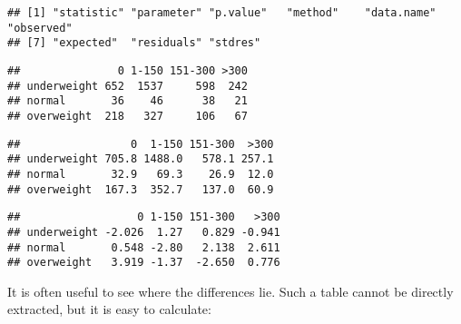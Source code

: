 \documentclass[]{book}
\newenvironment{Shaded}{\begin{snugshade}}{\end{snugshade}}
\newcommand{\DecValTok}[1]{\textcolor[rgb]{0.00,0.00,0.81}{#1}}
\newcommand{\StringTok}[1]{\textcolor[rgb]{0.31,0.60,0.02}{#1}}
\newcommand{\CommentTok}[1]{\textcolor[rgb]{0.56,0.35,0.01}{\textit{#1}}}
\newcommand{\OperatorTok}[1]{\textcolor[rgb]{0.81,0.36,0.00}{\textbf{#1}}}
\newcommand{\NormalTok}[1]{#1}
\theoremstyle{definition}
\theoremstyle{definition}
\theoremstyle{definition}
\theoremstyle{remark}
\begin{document}
\begin{verbatim}
## [1] "statistic" "parameter" "p.value"   "method"    "data.name" "observed" 
## [7] "expected"  "residuals" "stdres"
\end{verbatim}

\begin{Shaded}
\end{Shaded}

\begin{verbatim}
##               0 1-150 151-300 >300
## underweight 652  1537     598  242
## normal       36    46      38   21
## overweight  218   327     106   67
\end{verbatim}

\begin{Shaded}
\end{Shaded}

\begin{verbatim}
##                 0  1-150 151-300  >300
## underweight 705.8 1488.0   578.1 257.1
## normal       32.9   69.3    26.9  12.0
## overweight  167.3  352.7   137.0  60.9
\end{verbatim}

\begin{Shaded}
\end{Shaded}

\begin{verbatim}
##                  0 1-150 151-300   >300
## underweight -2.026  1.27   0.829 -0.941
## normal       0.548 -2.80   2.138  2.611
## overweight   3.919 -1.37  -2.650  0.776
\end{verbatim}

It is often useful to see where the differences lie. Such a table cannot
be directly extracted, but it is easy to calculate:

\begin{Shaded}
\end{Shaded}
\end{document}

